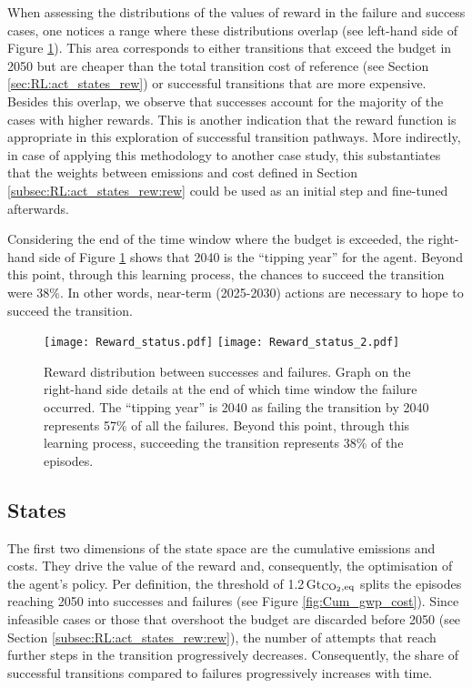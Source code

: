 \documentclass[11pt,twoside,a4paper,english]{article}
\begin{document}
\newpage
When assessing the distributions of the values of reward in the failure and success cases, one notices a range where these distributions overlap (see left-hand side of Figure \ref{fig:reward_status}). This area corresponds to either transitions that exceed the  budget in 2050 but are cheaper than the total transition cost of reference (see Section \ref{sec:RL:act_states_rew}) or successful transitions that are more expensive. Besides this overlap, we observe that successes account for the majority of the cases with higher rewards. This is another indication that the reward function is appropriate in this exploration of successful transition pathways. More indirectly, in case of applying this methodology to another case study, this substantiates that the weights between emissions and cost defined in Section \ref{subsec:RL:act_states_rew:rew} could be used as an initial step and fine-tuned afterwards.

Considering the end of the time window where the  budget is exceeded, the right-hand side of Figure \ref{fig:reward_status} shows that 2040 is the ``tipping year'' for the agent. Beyond this point, through this learning process, the chances to succeed the transition were 38\%. In other words, near-term (2025-2030) actions are necessary to hope to succeed the transition.

\begin{figure}[!htbp]
\centering
\texttt{[image: Reward\_status.pdf]}
\texttt{[image: Reward\_status\_2.pdf]}
\caption{Reward distribution between successes and failures. Graph on the right-hand side details at the end of which time window the failure occurred. The ``tipping year'' is 2040 as failing the transition by 2040 represents 57\% of all the failures. Beyond this point, through this learning process, succeeding the transition represents 38\% of the episodes. }
\label{fig:reward_status}
\end{figure}

\subsection{States}
\label{subsec:RL:learning:states}

The first two dimensions of the state space are the cumulative emissions and costs. They drive the value of the reward and, consequently, the optimisation of the agent's policy. Per definition, the threshold of 1.2\,Gt$_{\ce{CO2},\text{eq}}$ splits the episodes reaching 2050 into successes and failures (see Figure \ref{fig:Cum_gwp_cost}). Since infeasible cases or those that overshoot the  budget are discarded before 2050 (see Section \ref{subsec:RL:act_states_rew:rew}), the number of attempts that reach further steps in the transition progressively decreases. Consequently, the share of successful transitions compared to failures progressively increases with time. 
\end{document}
